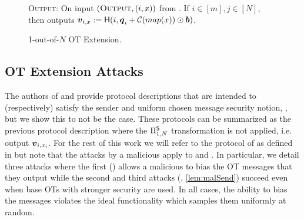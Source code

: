 \begin{figure}[t!]
{\begin{minipage}{0.95\linewidth}
			
			\textsc{Output:} On input $(\textsc{Output}, (i,x))$ from \send. If $i\in[m],j\in[N]$, then \send outputs $\boldsymbol{v}_{i,x}:=\mathsf{H}(i,\boldsymbol{q}_i+\mathcal{C}(map(x))\odot \boldsymbol{b})$.
	\end{minipage}}
	\caption{ 1-out-of-$N$ OT Extension.}
	\label{fig:otExt}
\end{figure}


%			


\subsection{OT Extension Attacks}\label{sec:extAttack}


The authors of \cite{C:KelOrsSch15,JC:ALSZ17} and \cite{RSA:OrrOrsSch17} provide protocol descriptions that are intended to (respectively) satisfy the sender and uniform chosen message security notion, , but we show this to not be the case. These protocols can be summarized as the previous protocol description where the $\Pi^{\mathsf{S}}_{1,N}$ transformation is not applied, i.e. output $\boldsymbol{v}_{i,x_i}$.  For the rest of this work we will refer to the protocol of \cite{RSA:OrrOrsSch17} as defined in  but note that the attacks by a malicious \rec apply to \cite[Figure 6, 7]{C:KelOrsSch15} and \cite[Protocol 10]{JC:ALSZ17}. In particular, we detail three attacks where the first ()  allows a malicious \rec to bias the OT messages that they output while the second and third attacks (, \ref{lem:malSend}) succeed even when base OTs with stronger security are used. In all cases, the ability to bias the messages violates the ideal functionality which samples them uniformly at random.


